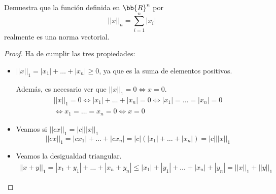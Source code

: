 \begin{ejercicio}
    Demuestra que la función definida en $\bb{R}^n$ por
    $$||x||_n = \sum_{i=1}^n |x_i|$$
    realmente es una norma vectorial.

    \begin{proof} Ha de cumplir las tres propiedades:
    \begin{itemize}
        \item $||x||_1 = |x_1| + \dots + |x_n| \geq 0$, ya que es la suma de elementos positivos.
        
        Además, es necesario ver que $||x||_1 = 0 \Longleftrightarrow x = 0$.
        \begin{multline*}
            ||x||_1 = 0 \Longleftrightarrow |x_1| + \dots + |x_n| = 0 \Longleftrightarrow |x_1| = \dots = |x_n| = 0 \\
            \Longleftrightarrow x_1 = \dots = x_n = 0 \Longleftrightarrow x = 0
        \end{multline*}

        \item Veamos si $||cx||_1 = |c| ||x||_1$
        \begin{equation*}
            ||cx||_1 = |cx_1| + \dots + |cx_n| = |c|(|x_1| + \dots + |x_n|) = |c|||x||_1
        \end{equation*}

        \item Veamos la desigualdad triangular.
        \begin{multline*}
            ||x+y||_1 = |x_1+y_1| + \dots + |x_n+y_n| \leq |x_1| + |y_1| + \dots + |x_n| + |y_n| = ||x||_1 + ||y||_1
        \end{multline*}
    \end{itemize}
    \end{proof}
\end{ejercicio}

